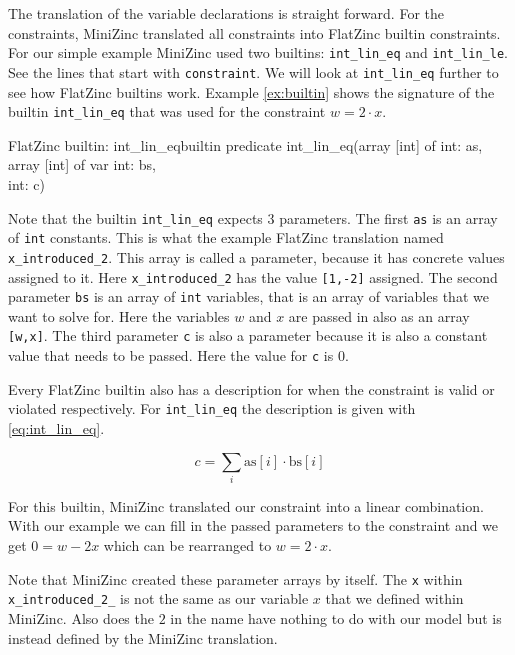 The translation of the variable declarations is straight forward. For the constraints, MiniZinc translated all constraints into FlatZinc builtin constraints. For our simple example MiniZinc used two builtins: \verb|int_lin_eq| and \verb|int_lin_le|. See the lines that start with \verb|constraint|. We will look at \verb|int_lin_eq| further to see how FlatZinc builtins work. Example \ref{ex:builtin} shows the signature of the builtin \verb|int_lin_eq| that was used for the constraint $w = 2 \cdot x$. \\

\begin{example}{FlatZinc builtin: int\_lin\_eq}{builtin}
	predicate int\_lin\_eq(array [int] of int: as,\\
	\null \hspace*{2.95cm} array [int] of var int: bs,\\
	\null \hspace*{2.95cm} int: c)
\end{example}

Note that the builtin \verb|int_lin_eq| expects 3 parameters. The first \verb|as| is an array of \verb|int| constants. This is what the example FlatZinc translation named \verb|x_introduced_2|. This array is called a parameter, because it has concrete values assigned to it. Here \verb|x_introduced_2| has the value \verb|[1,-2]| assigned. The second parameter \verb|bs| is an array of \verb|int| variables, that is an array of variables that we want to solve for. Here the variables $w$ and $x$ are passed in also as an array \verb|[w,x]|. The third parameter \verb|c| is also a parameter because it is also a constant value that needs to be passed. Here the value for \verb|c| is $0$.

Every FlatZinc builtin also has a description for when the constraint is valid or violated respectively. For \verb|int_lin_eq| the description is given with \cref{eq:int_lin_eq}.

\begin{equation} \label{eq:int_lin_eq}
	c = \sum_{i} \text{as}[i] \cdot \text{bs}[i]
\end{equation}

For this builtin, MiniZinc translated our constraint into a linear combination. With our example we can fill in the passed parameters to the constraint and we get $0 = w - 2x$ which can be rearranged to $w = 2 \cdot x$.

Note that MiniZinc created these parameter arrays by itself. The \verb|x| within \verb|x_introduced_2_| is not the same as our variable $x$ that we defined within MiniZinc. Also does the $2$ in the name have nothing to do with our model but is instead defined by the MiniZinc translation.


